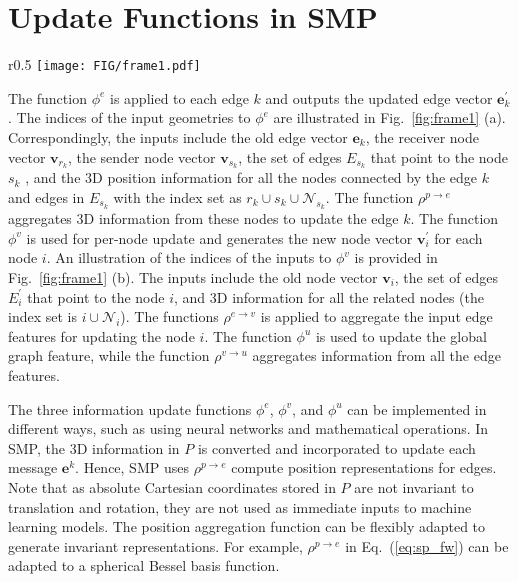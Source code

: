 \documentclass{article}
\begin{document}
\section{Update Functions in SMP}  \label{sec:supp_A}
\begin{wrapfigure}[14]{r}{0.5\textwidth}\vspace{-0.2cm}
    \texttt{[image: FIG/frame1.pdf]}
    \vspace{-10 pt}
    \caption{Illustrations of the functions $\phi^e$ (a) and $\phi^v$ (b).
}\label{fig:frame1}
    \vspace{-10 pt}
\end{wrapfigure}
The function $\phi^e$ is applied to each edge $k$ and outputs the updated edge vector $\mathbf{e}^\prime_k$. The indices of the
input geometries to $\phi^e$ are illustrated in Fig.~\ref{fig:frame1} (a).
Correspondingly, the inputs 
include the old edge vector $\mathbf{e}_k$, the receiver node vector $\mathbf{v}_{r_k}$, the sender node vector $\mathbf{v}_{s_k}$, the set of edges $E_{s_k}$ that point to the node $s_k$ , and the 3D position information for all the nodes connected by the edge $k$ and edges in $E_{s_k}$ with the index set as $r_k \cup s_k\cup \mathcal{N}_{s_k}$. 
The function $\rho^{p\rightarrow e}$ aggregates 3D information from these nodes to update the edge $k$.
The function $\phi^v$ is used for per-node update and generates the new node vector 
$\mathbf{v}^\prime_i$ for each node $i$. An illustration of the indices of the inputs to $\phi^v$ is provided in Fig.~\ref{fig:frame1} (b). The inputs include the old node vector $\mathbf{v}_i$, the set of edges $E_i^\prime$ that point to the node $i$, and 3D information for all the related nodes (the index set is $i\cup \mathcal{N}_i$). 
The functions $\rho^{e\rightarrow v}$ is applied to aggregate the input edge features for updating the node $i$.
The function $\phi^u$ is used to update the global graph feature, while the function $\rho^{v\rightarrow u}$ aggregates information from all the edge features.

The three information update functions $\phi^e$, $\phi^v$, and $\phi^u$
can be implemented in different ways, such as using neural networks and mathematical operations.
In SMP, the 3D information in $P$ is converted and incorporated to
update each message $\mathbf{e}^k $. Hence,
SMP uses $\rho^{p\rightarrow e}$ compute position representations for edges. 
Note that as absolute Cartesian coordinates stored in $P$
are not invariant to translation and rotation,
they are not used as immediate inputs to machine learning models.
The position aggregation function can be flexibly adapted to generate invariant representations. For example, $\rho^{p\rightarrow e}$ in Eq.~(\ref{eq:sp_fw}) can be adapted to a spherical Bessel basis function.
\end{document}
